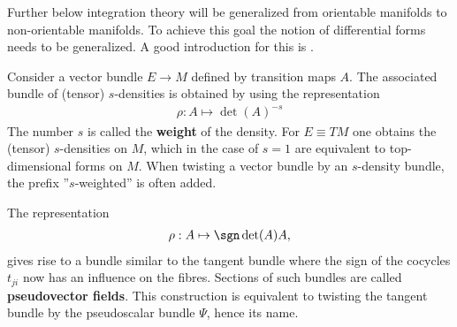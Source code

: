     Further below integration theory will be generalized from orientable manifolds to non-orientable manifolds. To achieve this goal the notion of differential forms needs to be generalized. A good introduction for this is \cite{tensor_bundle_calculus}.

    \begin{definition}\label{diff:density}
        Consider a vector bundle $E\rightarrow M$ defined by transition maps $A$. The associated bundle of (tensor) $s$-densities is obtained by using the representation
        \begin{gather}
            \rho:A\mapsto\det(A)^{-s}
        \end{gather}
        The number $s$ is called the \textbf{weight} of the density. For $E\equiv TM$ one obtains the (tensor) $s$-densities on $M$, which in the case of $s=1$ are equivalent to top-dimensional forms on $M$. When twisting a vector bundle by an $s$-density bundle, the prefix ''$s$-weighted'' is often added.
    \end{definition}

    \begin{example}[Pseudovectors]
        The representation
        \begin{gather}
            \rho:A\mapsto\sgn\det(A)A,
        \end{gather}
        gives rise to a bundle similar to the tangent bundle where the sign of the cocycles $t_{ji}$ now has an influence on the fibres. Sections of such bundles are called \textbf{pseudovector fields}. This construction is equivalent to twisting the tangent bundle by the pseudoscalar bundle $\Psi$, hence its name.
    \end{example}

